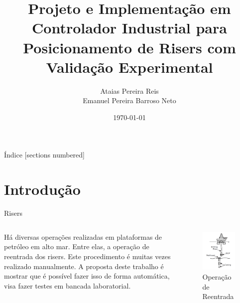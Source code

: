 \documentclass[10pt]{beamer}
\title{Projeto e Implementação em Controlador Industrial para Posicionamento de Risers com Validação Experimental}
\date{\today}
\author{Ataias Pereira Reis\\ Emanuel Pereira Barroso Neto}
\institute{Faculdade de Tecnologia\\ Universidade de Brasília}
\begin{document}
\maketitle

\begin{frame}{Índice}
  [sections numbered]
  \tableofcontents[hideallsubsections]
\end{frame}

\section{Introdução}

\begin{frame}[fragile]{Risers}

\begin{columns}[T] %
\begin{column}{.5\textwidth}

\begin{block}{} Há diversas operações realizadas em plataformas de petróleo em alto mar. Entre elas, a operação de reentrada dos risers. Este procedimento é muitas vezes realizado manualmente. A proposta deste trabalho é mostrar que é possível fazer isso de forma automática, visa fazer testes em bancada laboratorial.\end{block}

\end{column}%
\hfill%
\begin{column}{.5\textwidth}

\begin{figure}[!ht]
\centering
\includegraphics[width=1\linewidth]{figures/introducao/riser}
\caption{Operação de Reentrada\cite{redytton}}
\end{figure}


\end{column}
\end{columns}
\end{frame}
\end{document}
